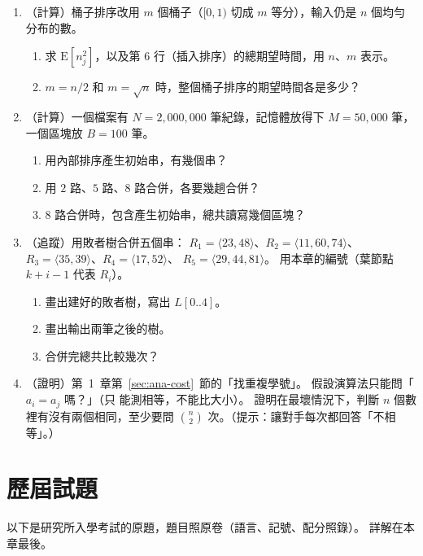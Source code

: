 \begin{enumerate}
\item （計算）桶子排序改用 $m$ 個桶子（$[0, 1)$ 切成 $m$ 等分），輸入仍是 $n$ 個均勻
分布的數。
\begin{enumerate}
\item 求 $\mathrm{E}[n_j^2]$，以及第 6 行（插入排序）的總期望時間，用 $n$、$m$ 表示。
\item $m = n/2$ 和 $m = \sqrt{n}$ 時，整個桶子排序的期望時間各是多少？
\end{enumerate}

\item （計算）一個檔案有 $N = 2{,}000{,}000$ 筆紀錄，記憶體放得下 $M = 50{,}000$ 筆，
一個區塊放 $B = 100$ 筆。
\begin{enumerate}
\item 用內部排序產生初始串，有幾個串？
\item 用 $2$ 路、$5$ 路、$8$ 路合併，各要幾趟合併？
\item $8$ 路合併時，包含產生初始串，總共讀寫幾個區塊？
\end{enumerate}

\item （追蹤）用敗者樹合併五個串：
$R_1 = \langle 23, 48 \rangle$、$R_2 = \langle 11, 60, 74 \rangle$、
$R_3 = \langle 35, 39 \rangle$、$R_4 = \langle 17, 52 \rangle$、
$R_5 = \langle 29, 44, 81 \rangle$。 用本章的編號（葉節點 $k + i - 1$ 代表 $R_i$）。
\begin{enumerate}
\item 畫出建好的敗者樹，寫出 $L[0..4]$。
\item 畫出輸出兩筆之後的樹。
\item 合併完總共比較幾次？
\end{enumerate}

\item \label{lin-q-distinct}（證明）第~1~章第~\ref{sec:ana-cost}~節的「找重複學號」。 假設演算法只能問「$a_i = a_j$ 嗎？」（只
能測相等，不能比大小）。 證明在最壞情況下，判斷 $n$ 個數裡有沒有兩個相同，至少要問
$\binom{n}{2}$ 次。（提示：讓對手每次都回答「不相等」。）
\end{enumerate}

\section{歷屆試題}
\label{sec:lin-pastexam}

以下是研究所入學考試的原題，題目照原卷（語言、記號、配分照錄）。 詳解在本章最後。

